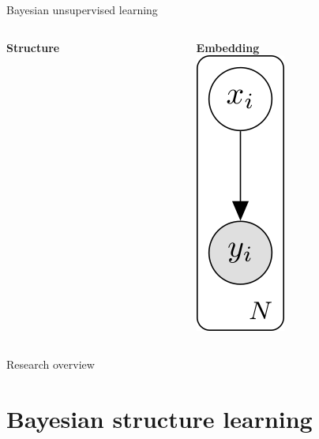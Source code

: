 \documentclass[10pt, compress]{beamer}
\begin{document}
\begin{frame}{Bayesian unsupervised learning}
  \centering
  \begin{columns}[T]
    \begin{column}{0.5\textwidth}
      \begin{overlayarea}{\textwidth}{7cm}
        \begin{center}
          \Large \textbf{Structure}\\ \vspace{10pt}
        \end{center}
      \end{overlayarea}
    \end{column}
    \begin{column}{0.5\textwidth}
      \begin{overlayarea}{\textwidth}{5cm}
        \centering
        \Large \textbf{Embedding} \\ \vspace{60pt}
        \includegraphics[]{img/bayesian-intro-right-1}
      \end{overlayarea}
    \end{column}
  \end{columns}
\end{frame}

\begin{frame}{Research overview}
  \centering
\end{frame}

\section{Bayesian structure learning}
\end{document}
